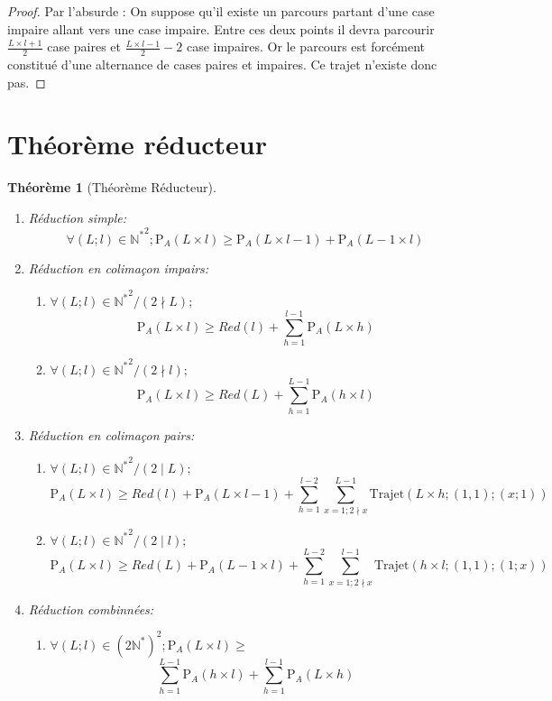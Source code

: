 \documentclass[twoside, a4paper, 12pt]{report}
\newtheorem{theorem}{Théorème}[chapter]
\newcommand{\trajet}[6]{\ensuremath{\text{Trajet}\left(#1 \times #2; (#3, #4); (#5; #6)\right)}}
\newcommand{\pa}[2]{\ensuremath{\text{P}_A\left(#1 \times #2\right)}}
\begin{document}
\begin{proof}
Par l'absurde :
On suppose qu'il existe un parcours partant d'une case impaire allant vers une case impaire.
Entre ces deux points il devra parcourir $\frac{L \times l + 1}{2}$ case paires et $\frac{L \times l - 1}{2} - 2$ case impaires.
Or le parcours est forcément constitué d'une alternance de cases paires et impaires. Ce trajet n'existe donc pas.

\end{proof}

\section{Théorème réducteur} \label{theoreme_reducteur}

\begin{theorem}[Théorème Réducteur]
\begin{enumerate}

\item Réduction simple: 
\[\forall (L; l) \in \mathbb{N^*}^2; \pa{L}{l} \geq \pa{L}{l-1} + \pa{L-1}{l}\]

\item Réduction en colimaçon impairs: 
\begin{enumerate}
\item $\forall (L; l) \in \mathbb{N^*}^2 /( 2\nmid L);$
\[ \pa{L}{l} \geq Red(l) + \sum_{h=1}^{l-1}\pa{L}{h}\]

\item $\forall (L; l) \in \mathbb{N^*}^2 /( 2\nmid l);$
\[ \pa{L}{l} \geq Red(L) + \sum_{h=1}^{L-1}\pa{h}{l}\]
\end{enumerate}

\item Réduction en colimaçon pairs:

\begin{enumerate}
\item $\forall (L; l) \in \mathbb{N^*}^2 / (2\mid L);  $
\[\pa{L}{l} \geq Red(l) + \pa{L}{l-1} + \sum_{h=1}^{l-2}\sum_{x=1; 2 \nmid x}^{L-1} \trajet{L}{h}{1}{1}{x}{1}\]

\item $\forall (L; l) \in \mathbb{N^*}^2 / (2\mid l); $
\[\pa{L}{l} \geq Red(L) + \pa{L-1}{l} + \sum_{h=1}^{L-2}\sum_{x=1; 2 \nmid x}^{l-1} \trajet{h}{l}{1}{1}{1}{x}\]
\end{enumerate}

\item Réduction combinnées:

\begin{enumerate}
\item $ \forall (L; l) \in \left(2\mathbb{N^*}\right)^2 ; \pa{L}{l} \geq$
\[  \sum_{h=1}^{L-1}\pa{h}{l} + \sum_{h=1}^{l-1}\pa{L}{h}\]


\end{enumerate}
\end{enumerate}
\end{theorem}
\end{document}
